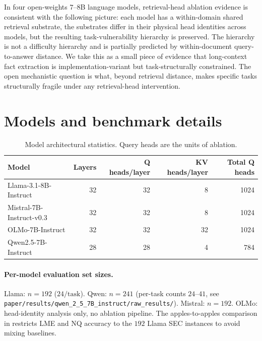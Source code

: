 \documentclass{article}
\theoremstyle{plain}
\theoremstyle{definition}
\theoremstyle{remark}
\begin{document}
In four open-weights $7$--$8$B language models, retrieval-head ablation evidence is consistent with the following picture: each model has a within-domain shared retrieval substrate, the substrates differ in their physical head identities across models, but the resulting task-vulnerability hierarchy is preserved. The hierarchy is not a difficulty hierarchy and is partially predicted by within-document query-to-answer distance. We take this as a small piece of evidence that long-context fact extraction is implementation-variant but task-structurally constrained. The open mechanistic question is what, beyond retrieval distance, makes specific tasks structurally fragile under any retrieval-head intervention.

\clearpage




\newpage
\appendix
\onecolumn

\section{Models and benchmark details}
\label{app:models}

\begin{table}[h]
\centering
\small
\begin{tabular}{lrrrr}
\toprule
\textbf{Model} & \textbf{Layers} & \textbf{Q heads/layer} & \textbf{KV heads/layer} & \textbf{Total Q heads} \\
\midrule
Llama-3.1-8B-Instruct      & 32 & 32 & 8  & 1024 \\
Mistral-7B-Instruct-v0.3   & 32 & 32 & 8  & 1024 \\
OLMo-7B-Instruct           & 32 & 32 & 32 & 1024 \\
Qwen2.5-7B-Instruct        & 28 & 28 & 4  & 784 \\
\bottomrule
\end{tabular}
\caption{Model architectural statistics. Query heads are the units of ablation.}
\end{table}

\paragraph{Per-model evaluation set sizes.} Llama: $n{=}192$ ($24/\text{task}$). Qwen: $n{=}241$ (per-task counts $24$--$41$, see \texttt{paper/results/qwen\_2\_5\_7B\_instruct/raw\_results/}). Mistral: $n{=}192$. OLMo: head-identity analysis only, no ablation pipeline. The apples-to-apples comparison in  restricts LME and NQ accuracy to the $192$ Llama SEC instances to avoid mixing baselines.
\end{document}
